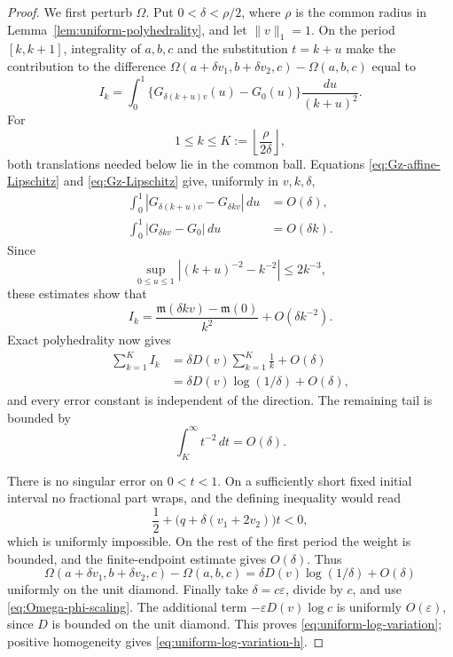 \documentclass[11pt,reqno,letterpaper]{amsart}
\numberwithin{equation}{section}
\theoremstyle{definition}
\theoremstyle{remark}
\begin{document}
\begin{proof}
We first perturb \(\Omega\).  Put \(0<\delta<\rho/2\), where \(\rho\)
is the common radius in Lemma~\ref{lem:uniform-polyhedrality}, and let
\(\|v\|_1=1\).  On the period \([k,k+1]\), integrality of \(a,b,c\) and
the substitution \(t=k+u\) make the contribution to the difference
\(\Omega(a+\delta v_1,b+\delta v_2,c)-\Omega(a,b,c)\) equal to
\begin{equation}\label{eq:local-period-block}
 I_k=\int_0^1
 \{G_{\delta(k+u)v}(u)-G_0(u)\}\frac{du}{(k+u)^2}.
\end{equation}
For
\[
 1\leq k\leq K:=\left\lfloor\frac{\rho}{2\delta}\right\rfloor,
\]
both translations needed below lie in the common ball.  Equations
\eqref{eq:Gz-affine-Lipschitz} and \eqref{eq:Gz-Lipschitz} give,
uniformly in \(v,k,\delta\),
\begin{align}
 \int_0^1|G_{\delta(k+u)v}-G_{\delta kv}|\,du&=O(\delta),
 \label{eq:local-block-affine-error}\\
 \int_0^1|G_{\delta kv}-G_0|\,du&=O(\delta k).
 \label{eq:local-block-translation-error}
\end{align}
Since
\[
 \sup_{0\leq u\leq1}|(k+u)^{-2}-k^{-2}|\leq2k^{-3},
\]
these estimates show that
\begin{equation}\label{eq:local-block-replacement}
 I_k=\frac{\mathfrak m(\delta kv)-\mathfrak m(0)}{k^2}
      +O(\delta k^{-2}).
\end{equation}
Exact polyhedrality now gives
\begin{equation}\label{eq:local-harmonic-sum}
 \begin{split}
 \sum_{k=1}^KI_k
 &=\delta D(v)\sum_{k=1}^K\frac1k+O(\delta)\\
 &=\delta D(v)\log(1/\delta)+O(\delta),
 \end{split}
\end{equation}
and every error constant is independent of the direction.  The remaining
tail is bounded by
\[
 \int_K^\infty t^{-2}\,dt=O(\delta).
\]

There is no singular error on \(0<t<1\).  On a sufficiently short fixed
initial interval no fractional part wraps, and the defining inequality
would read
\[
 \frac12+\bigl(q+\delta(v_1+2v_2)\bigr)t<0,
\]
which is uniformly impossible.  On the rest of the first period the
weight is bounded, and the finite-endpoint estimate gives \(O(\delta)\).
Thus
\[
 \Omega(a+\delta v_1,b+\delta v_2,c)-\Omega(a,b,c)
 =\delta D(v)\log(1/\delta)+O(\delta)
\]
uniformly on the unit diamond.  Finally take \(\delta=c\varepsilon\),
divide by \(c\), and use \eqref{eq:Omega-phi-scaling}.  The additional
term \(-\varepsilon D(v)\log c\) is uniformly \(O(\varepsilon)\), since
\(D\) is bounded on the unit diamond.  This proves
\eqref{eq:uniform-log-variation}; positive homogeneity gives
\eqref{eq:uniform-log-variation-h}.
\end{proof}
\end{document}

